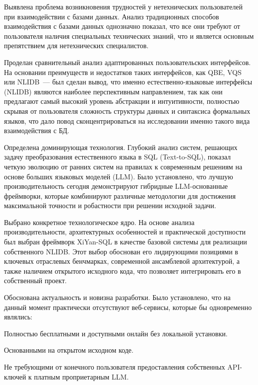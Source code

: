 \begin{compactenum}
      \item Выявлена проблема возникновения трудностей у нетехнических пользователей
      при взаимодействии с базами данных. Анализ традиционных
      способов взаимодействия с базами данных однозначно
      показал, что все они требуют от пользователя наличия специальных технических знаний,
      что и является основным препятствием для нетехнических специалистов.
      \item Проделан сравнительный анализ адаптированных пользовательских
      интерфейсов. На основании преимуществ и недостатков таких интерфейсов, как QBE, VQS или
      NLIDB~--- был сделан вывод,
      что именно естественно-языковые интерфейсы (NLIDB) являются наиболее перспективным направлением,
      так как они предлагают самый высокий уровень абстракции и интуитивности,
      полностью скрывая от пользователя сложность структуры данных и синтаксиса формальных языков,
      что дало повод сконцентрироваться на исследовании именно такого вида взаимодействия с БД.
      \item Определена доминирующая технология. Глубокий анализ систем,
      решающих задачу преобразования естественного языка в SQL (Text-to-SQL),
      показал четкую эволюцию от ранних систем на правилах к современным решениям на
      основе больших языковых моделей (LLM). Было установлено, что лучшую
      производительность сегодня демонстрируют гибридные LLM-основанные фреймворки,
      которые комбинируют различные методологии
      для достижения максимальной точности и робастности при решении исходной задачи.
      \item Выбрано конкретное технологическое ядро. На основе анализа производительности,
      архитектурных особенностей и практической доступности был выбран фреймворк XiYan-SQL
      в качестве базовой системы для реализации собственного NLIDB. Этот выбор обоснован его лидирующими
      позициями в ключевых отраслевых бенчмарках, современной ансамблевой архитектурой,
      а также наличием открытого исходного кода, что позволяет интегрировать его в собственный проект.
      \item Обоснована актуальность и новизна разработки.
      Было установлено, что на данный момент практически отсутствуют веб-сервисы, которые
      бы одновременно являлись:
      \begin{compactitem}
            \item Полностью бесплатными и доступными онлайн без локальной установки.
            \item Основанными на открытом исходном коде.
            \item Не требующими от конечного пользователя предоставления собственных API-ключей
            к платным проприетарным LLM.
      \end{compactitem}
\end{compactenum}

